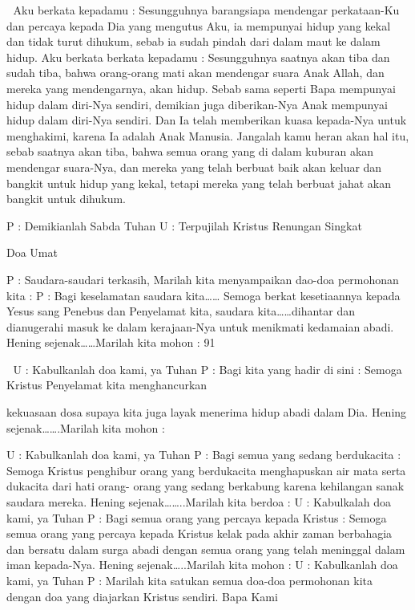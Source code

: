 
Aku berkata kepadamu : Sesungguhnya barangsiapa 
mendengar perkataan-Ku dan percaya kepada Dia yang 
mengutus Aku, ia mempunyai hidup yang kekal dan tidak 
turut dihukum, sebab ia sudah pindah dari dalam maut ke 
dalam hidup. Aku berkata berkata kepadamu : 
Sesungguhnya saatnya akan tiba dan sudah tiba, bahwa 
orang-orang mati akan mendengar suara Anak Allah, dan 
mereka yang mendengarnya, akan hidup. Sebab sama 
seperti Bapa mempunyai hidup dalam diri-Nya sendiri, 
demikian juga diberikan-Nya Anak mempunyai hidup 
dalam diri-Nya sendiri. Dan Ia telah memberikan kuasa 
kepada-Nya untuk menghakimi, karena Ia adalah Anak 
Manusia. Jangalah kamu heran akan hal itu, sebab saatnya 
akan tiba, bahwa semua orang yang di dalam kuburan akan 
mendengar suara-Nya, dan mereka yang telah berbuat baik 
akan keluar dan bangkit untuk hidup yang kekal, tetapi 
mereka yang telah berbuat jahat akan bangkit untuk 
dihukum. 

P : Demikianlah Sabda Tuhan 
U : Terpujilah Kristus 
Renungan Singkat 

Doa Umat 

P 
: Saudara-saudari terkasih, 
Marilah kita menyampaikan dao-doa permohonan kita : 
P 
: Bagi keselamatan saudara kita…… 
Semoga berkat kesetiaannya kepada Yesus sang Penebus 
dan Penyelamat kita, saudara kita……dihantar dan 
dianugerahi masuk ke dalam kerajaan-Nya untuk 
menikmati kedamaian abadi. 
Hening sejenak……Marilah kita mohon : 
91 



U : Kabulkanlah doa kami, ya Tuhan 
P : Bagi kita yang hadir di sini : 
Semoga Kristus Penyelamat kita menghancurkan 

kekuasaan dosa supaya kita juga layak menerima hidup 
abadi dalam Dia. 
Hening sejenak…….Marilah kita mohon 
: 


U : Kabulkanlah doa kami, ya Tuhan 
P 
: Bagi semua yang sedang berdukacita : 
Semoga Kristus penghibur orang yang berdukacita 
menghapuskan air mata serta dukacita dari hati orang-
orang yang sedang berkabung karena kehilangan sanak 
saudara mereka. 
Hening sejenak……..Marilah kita berdoa : 
U : Kabulkalah doa kami, ya Tuhan 
P 
: Bagi semua orang yang percaya kepada Kristus : 
Semoga semua orang yang percaya kepada Kristus kelak 
pada akhir zaman berbahagia dan bersatu dalam surga 
abadi dengan semua orang yang telah meninggal dalam 
iman kepada-Nya. 
Hening sejenak…..Marilah kita mohon : 
U : Kabulkanlah doa kami, ya Tuhan 
P 
: Marilah kita satukan semua doa-doa permohonan kita 
dengan doa yang diajarkan Kristus sendiri. 
Bapa Kami 

